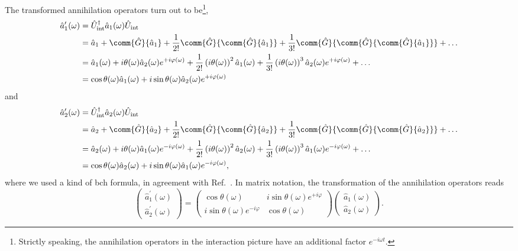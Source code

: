 The transformed annihilation operators turn out to be\footnote{Strictly speaking, the annihilation operators in the interaction picture have an additional factor $e^{-i\omega t}$.},
\begin{equation}
	\begin{split}
		\hat{a}_1^\prime(\omega)
		&=
		\hat{U}_\text{int}^\dagger
		\hat{a}_1(\omega)
		\hat{U}_\text{int}
		\\
		&=
		\hat{a}_1
		+
		\comm{\hat{G}}{\hat{a}_1}
		+
		\frac{1}{2!}
		\comm{\hat{G}}{\comm{\hat{G}}{\hat{a}_1}}
		+
		\frac{1}{3!}
		\comm{\hat{G}}{\comm{\hat{G}}{\comm{\hat{G}}{\hat{a}_1}}}
		+
		\dots
		\\
		&=
		\hat{a}_1(\omega)
		+
		i\theta(\omega)
		\hat{a}_2(\omega)
		e^{+i\varphi(\omega)}
		+
		\frac{1}{2!}
		\left(i\theta(\omega)\right)^2
		\hat{a}_1(\omega)
		+
		\frac{1}{3!}
		\left(i\theta(\omega)\right)^3
		\hat{a}_2(\omega)
		e^{+i\varphi(\omega)}
		+
		\dots
		\\
		&=
		\cos\theta(\omega)
		\hat{a}_1(\omega)
		+
		i\sin\theta(\omega)
		\hat{a}_2(\omega)
		e^{+i\varphi(\omega)}
	\end{split}
\end{equation}
and
\begin{equation}
	\begin{split}
		\hat{a}_2^\prime(\omega)
		&=
		\hat{U}_\text{int}^\dagger
		\hat{a}_2(\omega)
		\hat{U}_\text{int}
		\\
		&=
		\hat{a}_2
		+
		\comm{\hat{G}}{\hat{a}_2}
		+
		\frac{1}{2!}
		\comm{\hat{G}}{\comm{\hat{G}}{\hat{a}_2}}
		+
		\frac{1}{3!}
		\comm{\hat{G}}{\comm{\hat{G}}{\comm{\hat{G}}{\hat{a}_2}}}
		+
		\dots
		\\
		&=
		\hat{a}_2(\omega)
		+
		i\theta(\omega)
		\hat{a}_1(\omega)
		e^{-i\varphi(\omega)}
		+
		\frac{1}{2!}
		\left(i\theta(\omega)\right)^2
		\hat{a}_2(\omega)
		+
		\frac{1}{3!}
		\left(i\theta(\omega)\right)^3
		\hat{a}_1(\omega)
		e^{-i\varphi(\omega)}
		+
		\dots
		\\
		&=
		\cos\theta(\omega)
		\hat{a}_2(\omega)
		+
		i\sin\theta(\omega)
		\hat{a}_1(\omega)
		e^{-i\varphi(\omega)}
		,
	\end{split}
\end{equation}
where we used a kind of \gls{bch} formula, in agreement with Ref.~\cite[p.~131]{Haroche2006}.
In matrix notation, the transformation of the annihilation operators reads
\begin{equation}
	\begin{pmatrix}
        \hat{a}_1^\prime(\omega) \\
        \hat{a}_2^\prime(\omega)
    \end{pmatrix}
    =
    \begin{pmatrix}
        \cos\theta(\omega) & i\sin\theta(\omega)e^{+i\varphi} 
        \\
        i\sin\theta(\omega)e^{-i\varphi} & \cos\theta(\omega)
    \end{pmatrix}
    \begin{pmatrix}
        \hat{a}_1(\omega) \\
        \hat{a}_2(\omega)
    \end{pmatrix}
    \label{eq:waveguide_coupler_transformation}
    .
\end{equation}
